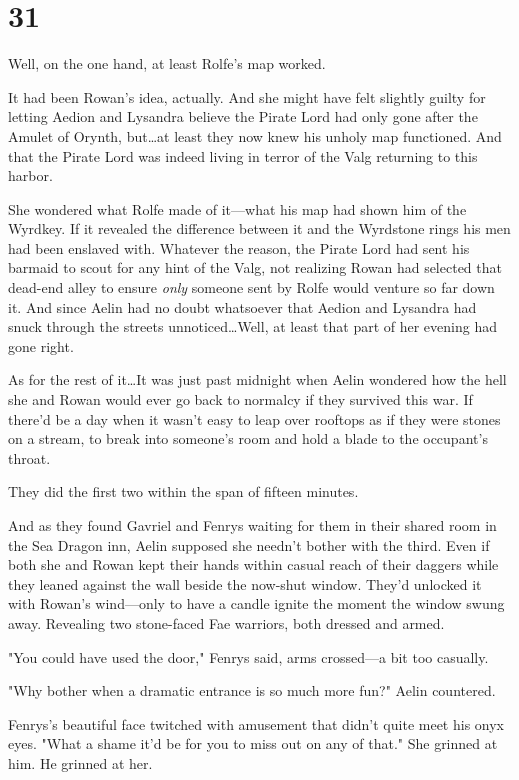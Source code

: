 
\chapter{31}

Well, on the one hand, at least Rolfe's map worked.

It had been Rowan's idea, actually.
And she might have felt slightly guilty for letting Aedion and Lysandra believe the Pirate Lord had only gone after the Amulet of Orynth, but\ldots at least they now knew his unholy map functioned.
And that the Pirate Lord was indeed living in terror of the Valg returning to this harbor.

She wondered what Rolfe made of it---what his map had shown him of the Wyrdkey.
If it revealed the difference between it and the Wyrdstone rings his men had been enslaved with.
Whatever the reason, the Pirate Lord had sent his barmaid to scout for any hint of the Valg, not realizing Rowan had selected that dead-end alley to ensure \emph{only}
someone sent by Rolfe would venture so far down it.
And since Aelin had no doubt whatsoever that Aedion and Lysandra had snuck through the streets unnoticed\ldots Well, at least that part of her evening had gone right.

As for the rest of it\ldots It was just past midnight when Aelin wondered how the hell she and Rowan would ever go back to normalcy if they survived this war.
If there'd be a day when it wasn't easy to leap over rooftops as if they were stones on a stream, to break into someone's room and hold a blade to the occupant's throat.

They did the first two within the span of fifteen minutes.

And as they found Gavriel and Fenrys waiting for them in their shared room in the Sea Dragon inn, Aelin supposed she needn't bother with the third.
Even if both she and Rowan kept their hands within casual reach of their daggers while they leaned against the wall beside the now-shut window.
They'd unlocked it with Rowan's wind---only to have a candle ignite the moment the window swung away.
Revealing two stone-faced Fae warriors, both dressed and armed.

"You could have used the door," Fenrys said, arms crossed---a bit too casually.

"Why bother when a dramatic entrance is so much more fun?"
Aelin countered.

Fenrys's beautiful face twitched with amusement that didn't quite meet his onyx eyes.
"What a shame it'd be for you to miss out on any of that."
She grinned at him.
He grinned at her.

